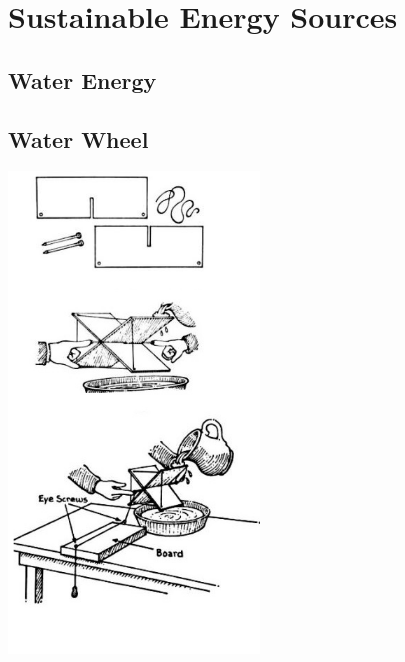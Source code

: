 \section{Sustainable Energy Sources}

\begin{multicols}{2}


\section*{Water Energy}


\subsection{Water Wheel} 

\begin{center}
\includegraphics[width=0.5\textwidth]{./img/water-wheel.jpg}
\end{center}


\end{multicols}
